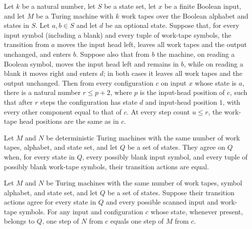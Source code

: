 \begin{theorem}
\label{Turing.FinTM.rewind_heads}
\leanok
{}
Let $k$ be a natural number, let $S$ be a state set, let $x$ be a finite Boolean input,
and let $M$ be a Turing machine with $k$ work tapes over the Boolean alphabet and states
in $S$. Let $a,b\in S$ and let $d$ be an optional state. Suppose that, for every input
symbol (including a blank) and every tuple of work-tape symbols, the transition from $a$
moves the input head left, leaves all work tapes and the output unchanged, and enters
$b$. Suppose also that from $b$ the machine, on reading a Boolean symbol, moves the
input head left and remains in $b$, while on reading a blank it moves right and enters
$d$; in both cases it leaves all work tapes and the output unchanged. Then from every
configuration $c$ on input $x$ whose state is $a$, there is a natural number $r\leq
p+2$, where $p$ is the input-head position of $c$, such that after $r$ steps the
configuration has state $d$ and input-head position $1$, with every other component
equal to that of $c$. At every step count $u\leq r$, the work-tape head positions are
the same as in $c$.
\end{theorem}

\begin{definition}
\label{Turing.MultiTapeTM.AgreeOn}
\leanok
{}
Let $M$ and $N$ be deterministic Turing machines with the same number of work tapes,
alphabet, and state set, and let $Q$ be a set of states. They agree on $Q$ when, for
every state in $Q$, every possibly blank input symbol, and every tuple of possibly blank
work-tape symbols, their transition actions are equal.
\end{definition}

\begin{theorem}
\label{Turing.MultiTapeTM.step_eq_of_agreeOn}
\leanok
{}
Let $M$ and $N$ be Turing machines with the same number of work tapes, symbol alphabet,
and state set, and let $Q$ be a set of states. Suppose their transition actions agree
for every state in $Q$ and every possible scanned input and work-tape symbols. For any
input and configuration $c$ whose state, whenever present, belongs to $Q$, one step of
$N$ from $c$ equals one step of $M$ from $c$.
\end{theorem}

